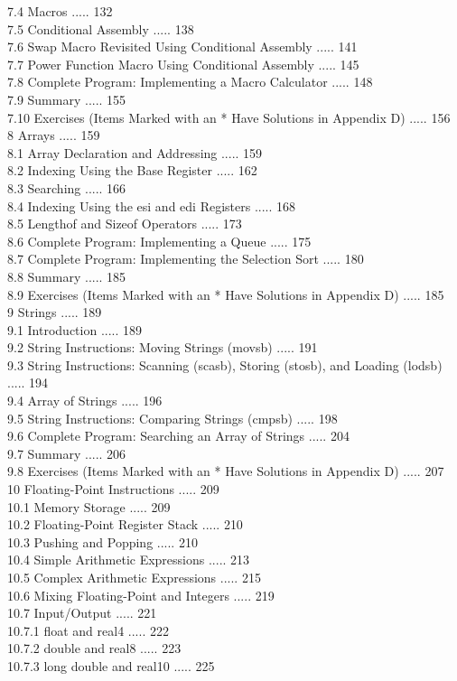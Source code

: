 \documentclass[10pt]{book}
\begin{document}
7.4 Macros ..... 132\\
7.5 Conditional Assembly ..... 138\\
7.6 Swap Macro Revisited Using Conditional Assembly ..... 141\\
7.7 Power Function Macro Using Conditional Assembly ..... 145\\
7.8 Complete Program: Implementing a Macro Calculator ..... 148\\
7.9 Summary ..... 155\\
7.10 Exercises (Items Marked with an * Have Solutions in Appendix D) ..... 156\\
8 Arrays ..... 159\\
8.1 Array Declaration and Addressing ..... 159\\
8.2 Indexing Using the Base Register ..... 162\\
8.3 Searching ..... 166\\
8.4 Indexing Using the esi and edi Registers ..... 168\\
8.5 Lengthof and Sizeof Operators ..... 173\\
8.6 Complete Program: Implementing a Queue ..... 175\\
8.7 Complete Program: Implementing the Selection Sort ..... 180\\
8.8 Summary ..... 185\\
8.9 Exercises (Items Marked with an * Have Solutions in Appendix D) ..... 185\\
9 Strings ..... 189\\
9.1 Introduction ..... 189\\
9.2 String Instructions: Moving Strings (movsb) ..... 191\\
9.3 String Instructions: Scanning (scasb), Storing (stosb), and Loading (lodsb) ..... 194\\
9.4 Array of Strings ..... 196\\
9.5 String Instructions: Comparing Strings (cmpsb) ..... 198\\
9.6 Complete Program: Searching an Array of Strings ..... 204\\
9.7 Summary ..... 206\\
9.8 Exercises (Items Marked with an * Have Solutions in Appendix D) ..... 207\\
10 Floating-Point Instructions ..... 209\\
10.1 Memory Storage ..... 209\\
10.2 Floating-Point Register Stack ..... 210\\
10.3 Pushing and Popping ..... 210\\
10.4 Simple Arithmetic Expressions ..... 213\\
10.5 Complex Arithmetic Expressions ..... 215\\
10.6 Mixing Floating-Point and Integers ..... 219\\
10.7 Input/Output ..... 221\\
10.7.1 float and real4 ..... 222\\
10.7.2 double and real8 ..... 223\\
10.7.3 long double and real10 ..... 225\\
\end{document}
